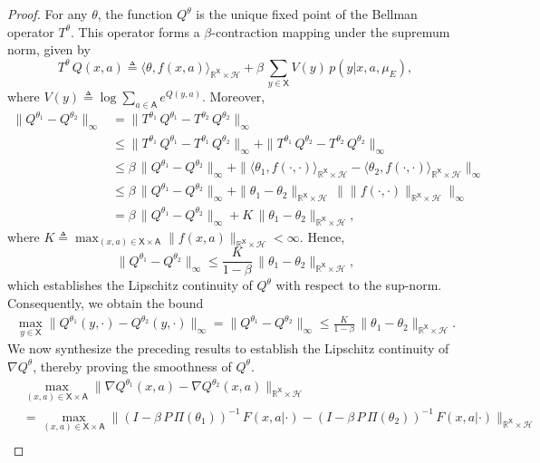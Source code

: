 \documentclass[11pt]{article}
\newcommand{\R}{\mathbb{R}}
\newcommand{\sX}{{\mathsf X}}
\newcommand{\sA}{{\mathsf A}}
\newcommand{\cH}{{\mathcal H}}
\begin{document}
\begin{proof}
For any $\theta$, the function $Q^{\theta}$ is the unique fixed point of the Bellman operator $T^{\theta}$. This operator forms a $\beta$-contraction mapping under the supremum norm, given by
$$
T^{\theta} \, Q(x,a) \triangleq \langle \theta, f(x,a) \rangle_{\R^{\sX} \times \cH} + \beta \, \sum_{y \in \sX} V(y) \, p(y|x,a,\mu_E),
$$
where $V(y) \triangleq \log \sum_{a \in \sA} e^{Q(y,a)}$. Moreover,
\begin{align*} \|Q^{\theta_1} - Q^{\theta_2}\|_{\infty} 
&= \|T^{\theta_1} \, Q^{\theta_1} - T^{\theta_2} \, Q^{\theta_2}\|_{\infty} \\
&\leq \|T^{\theta_1} \, Q^{\theta_1} - T^{\theta_1} \, Q^{\theta_2}\|_{\infty}  + \|T^{\theta_1} \, Q^{\theta_2} - T^{\theta_2} \, Q^{\theta_2}\|_{\infty} \\
&\leq  \beta \, \|Q^{\theta_1} - Q^{\theta_2}\|_{\infty} + \| \langle \theta_1, f(\cdot,\cdot) \rangle_{\R^{\sX} \times \cH} -  \langle \theta_2, f(\cdot,\cdot) \rangle_{\R^{\sX} \times \cH}\|_{\infty} \\
&\leq  \beta \, \|Q^{\theta_1} - Q^{\theta_2}\|_{\infty}  +  \| \theta_1 - \theta_2 \|_{\R^{\sX} \times \cH} \, \|\| f(\cdot,\cdot) \|_{\R^{\sX} \times \cH}\|_{\infty}  \\
&= \beta \, \|Q^{\theta_1} - Q^{\theta_2}\|_{\infty} + K \, \| \theta_1 - \theta_2 \|_{\R^{\sX} \times \cH},
\end{align*}
where $K \triangleq \max_{(x,a) \in \sX \times \sA} \| f(x,a) \|_{\R^{\sX} \times \cH} < \infty$. Hence, 
$$
\|Q^{\theta_1} - Q^{\theta_2}\|_{\infty} \leq \frac{K}{1-\beta} \, \| \theta_1 - \theta_2 \|_{\R^{\sX} \times \cH},
$$ 
which establishes the Lipschitz continuity of $Q^{\theta}$ with respect to the sup-norm. Consequently, we obtain the bound 
\begin{align*}
\max_{y \in \sX} \|Q^{\theta_1}(y,\cdot) - Q^{\theta_2}(y,\cdot)\|_{\infty} =  \|Q^{\theta_1} - Q^{\theta_2}\|_{\infty}  \leq \frac{K}{1-\beta} \, \| \theta_1 - \theta_2 \|_{\R^{\sX} \times \cH}.
\end{align*}
We now synthesize the preceding results to establish the Lipschitz continuity of $\nabla Q^{\theta}$, thereby proving the smoothness of $Q^{\theta}$.
\small
\begin{align*}
&\max_{(x,a) \in \sX \times \sA} \|\nabla Q^{\theta_1}(x,a) - \nabla Q^{\theta_2}(x,a)\|_{\R^{\sX} \times \cH}  \\
&= \max_{(x,a) \in \sX \times \sA} \|(I -\beta \, P \, \Pi(\theta_1))^{-1} \, F(x,a|\cdot) - (I -\beta \, P \, \Pi(\theta_2))^{-1} \, F(x,a|\cdot)\|_{\R^{\sX} \times \cH} \\

\end{align*}
\end{proof}
\end{document}
